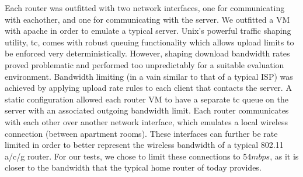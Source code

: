 \documentclass[12pt]{article}
\begin{document}
	Each router was outfitted with two network interfaces, one for communicating with eachother, and one for communicating with the server. We outfitted a VM with apache in order to emulate a typical server. Unix's powerful traffic shaping utility, tc, comes with robust queuing functionality which allows upload limits to be enforced very deterministically. However, shaping download bandwidth rates proved problematic and performed too unpredictably for a suitable evaluation environment. Bandwidth limiting (in a vain similar to that of a typical ISP) was achieved by applying upload rate rules to each client that contacts the server. A static configuration allowed each router VM to have a separate tc queue on the server with an associated outgoing bandwidth limit. Each router communicates with each other over another network interface, which emulates a local wireless connection (between apartment rooms). These interfaces can further be rate limited in order to better represent the wireless bandwidth of a typical 802.11 a/c/g router. For our tests, we chose to limit these connections to $54 mbps$, as it is closer to the bandwidth that the typical home router of today provides.
\end{document}
